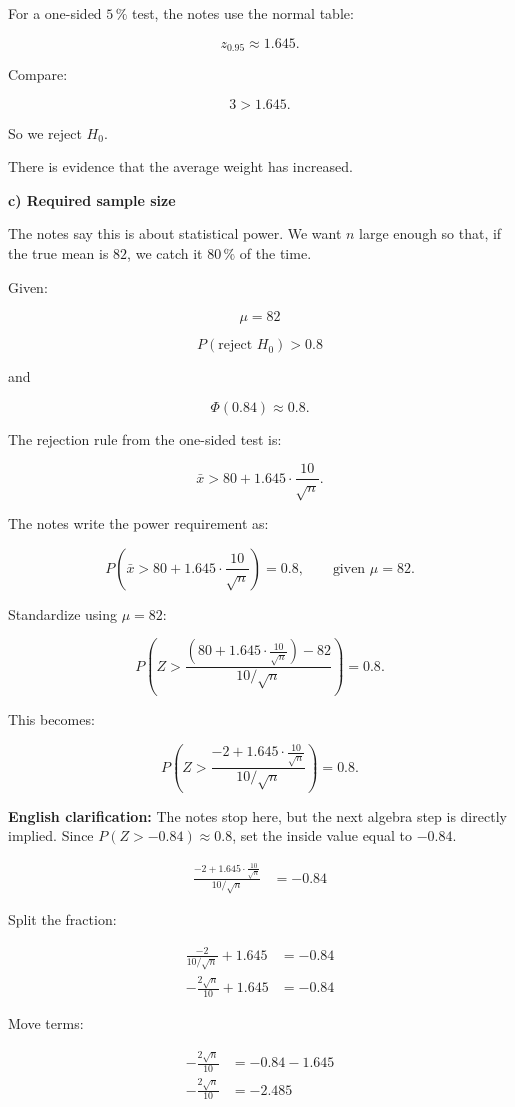 \documentclass[10pt]{article}
\begin{document}
For a one-sided $5\,\%$ test, the notes use the normal table:

\[
z_{0.95}\approx 1.645.
\]

Compare:

\[
3>1.645.
\]

So we reject $H_0$.

There is evidence that the average weight has increased.

\textbf{c) Required sample size}

The notes say this is about statistical power.
We want $n$ large enough so that, if the true mean is $82$,
we catch it $80\,\%$ of the time.

Given:

\[
\mu=82
\]

\[
P(\text{reject }H_0)>0.8
\]

and

\[
\Phi(0.84)\approx 0.8.
\]

The rejection rule from the one-sided test is:

\[
\bar{x}>
80+1.645\cdot \frac{10}{\sqrt{n}}.
\]

The notes write the power requirement as:

\[
P\left(
\bar{x}>
80+1.645\cdot \frac{10}{\sqrt{n}}
\right)
=0.8,
\qquad \text{given }\mu=82.
\]

Standardize using $\mu=82$:

\[
P\left(
Z>
\frac{
\left(80+1.645\cdot \frac{10}{\sqrt{n}}\right)-82
}
{10/\sqrt{n}}
\right)
=0.8.
\]

This becomes:

\[
P\left(
Z>
\frac{
-2+1.645\cdot \frac{10}{\sqrt{n}}
}
{10/\sqrt{n}}
\right)
=0.8.
\]

\textbf{English clarification:}
The notes stop here, but the next algebra step is directly implied.
Since $P(Z>-0.84)\approx 0.8$, set the inside value equal to $-0.84$.

\begin{align*}
\frac{
-2+1.645\cdot \frac{10}{\sqrt{n}}
}
{10/\sqrt{n}}
&=-0.84
\end{align*}

Split the fraction:

\begin{align*}
\frac{-2}{10/\sqrt{n}}
+1.645
&=-0.84 \\[2mm]
-\frac{2\sqrt{n}}{10}
+1.645
&=-0.84
\end{align*}

Move terms:

\begin{align*}
-\frac{2\sqrt{n}}{10}
&=
-0.84-1.645 \\[2mm]
-\frac{2\sqrt{n}}{10}
&=
-2.485
\end{align*}
\end{document}
